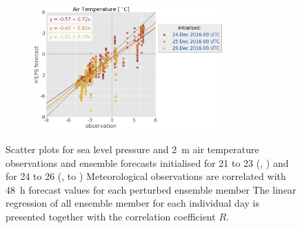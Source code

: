 \begin{figure}[H]
\begin{subfigure}[b]{0.49\textwidth}
		\centering
		\includegraphics[trim={25.cm 15.5cm 0cm 3.6cm},clip,
		width=0.8\textwidth]{./fig_sfc_temp/obs_model_20161224_26_00_label}
	\end{subfigure}
	\caption{Scatter plots for sea level pressure and \SI{2}{\metre} air temperature observations and ensemble forecasts initialised for \num{21} to \SI{23}{\dec} (\protect{}, \protect{})
		and  for \num{24} to \SI{26}{\dec} (\protect{}, to \protect{})
		Meteorological observations are correlated with \SI{48}{\hour} forecast values for each perturbed ensemble member
		 The linear regression of all ensemble member for each individual day is presented together with the correlation coefficient $R$. %
	}\label{fig:scat:SLP_T}
\end{figure}
